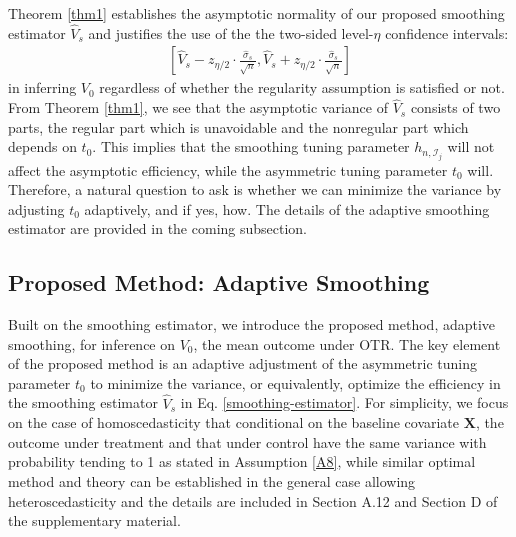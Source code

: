 \documentclass[11pt]{article}
\theoremstyle{referenceplain}
\theoremstyle{referencedefinition}
\theoremstyle{referenceremark}
\begin{document}
Theorem \ref{thm1} establishes the asymptotic normality of our proposed smoothing estimator $\widehat{V}_s$ and justifies the use of the the two-sided level-{$\eta$} confidence intervals:
 \begin{align}
     \left[\widehat{V}_{s}-{z_{\eta/2}}\cdot\frac{\widehat{\sigma}_{s}}{\sqrt{n}},\widehat{V}_{s}+{z_{\eta/2}}\cdot\frac{\widehat{\sigma}_{s}}{\sqrt{n}}\right]
 \end{align}
 in inferring $V_0$ regardless of whether the regularity assumption is satisfied or not. From Theorem \ref{thm1}, we see that the asymptotic variance of $\widehat{V}_s$ consists of two parts, the regular part which is unavoidable and the nonregular part which depends on $t_0$. This implies that the smoothing tuning parameter $h_{n,\mathcal{I}_{j}}$ will not affect the asymptotic efficiency, while the asymmetric tuning parameter $t_0$ will. Therefore, a natural question to ask is whether we can minimize the variance by adjusting $t_0$ adaptively, and if yes, how. The details of the adaptive smoothing estimator are provided in the coming subsection.






\subsection{Proposed Method: Adaptive Smoothing}
Built on the smoothing estimator, we introduce the proposed method, adaptive smoothing, for inference on $V_0$, the mean outcome under OTR. The key element of the proposed method is an adaptive adjustment of the asymmetric tuning parameter $t_0$ to minimize the variance, or equivalently, optimize the efficiency in the smoothing estimator $\widehat{V}_s$ in Eq. \eqref{smoothing-estimator}. For simplicity, we focus on the case of homoscedasticity that conditional on the baseline covariate $\mathbf{X}$, the outcome under treatment and that under control have the same variance with probability tending to 1 as stated in Assumption \ref{A8}, while similar optimal method and theory can be established in the general case allowing heteroscedasticity and the details are included in Section A.12 and Section D of the supplementary material.
\end{document}
